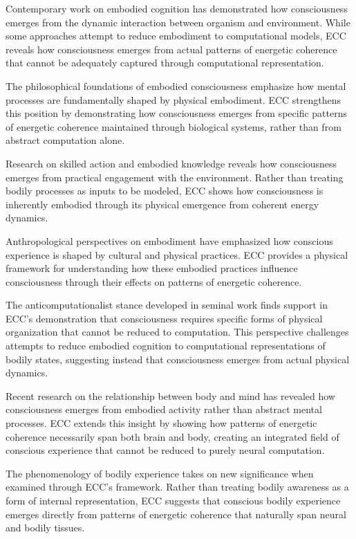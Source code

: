 \begin{refsection}
Contemporary work on embodied cognition \cite{Clark1997} has demonstrated how consciousness emerges from the dynamic interaction between organism and environment. While some approaches attempt to reduce embodiment to computational models, ECC reveals how consciousness emerges from actual patterns of energetic coherence that cannot be adequately captured through computational representation.

The philosophical foundations of embodied consciousness \cite{Lakoff1999} emphasize how mental processes are fundamentally shaped by physical embodiment. ECC strengthens this position by demonstrating how consciousness emerges from specific patterns of energetic coherence maintained through biological systems, rather than from abstract computation alone.

Research on skilled action and embodied knowledge \cite{Ingold2000} reveals how consciousness emerges from practical engagement with the environment. Rather than treating bodily processes as inputs to be modeled, ECC shows how consciousness is inherently embodied through its physical emergence from coherent energy dynamics.

Anthropological perspectives on embodiment \cite{Csordas1994} have emphasized how conscious experience is shaped by cultural and physical practices. ECC provides a physical framework for understanding how these embodied practices influence consciousness through their effects on patterns of energetic coherence.

The anticomputationalist stance developed in seminal work \cite{Dreyfus1992} finds support in ECC's demonstration that consciousness requires specific forms of physical organization that cannot be reduced to computation. This perspective challenges attempts to reduce embodied cognition to computational representations of bodily states, suggesting instead that consciousness emerges from actual physical dynamics.

Recent research on the relationship between body and mind \cite{Gallagher2005} has revealed how consciousness emerges from embodied activity rather than abstract mental processes. ECC extends this insight by showing how patterns of energetic coherence necessarily span both brain and body, creating an integrated field of conscious experience that cannot be reduced to purely neural computation.

The phenomenology of bodily experience \cite{Leder1990} takes on new significance when examined through ECC's framework. Rather than treating bodily awareness as a form of internal representation, ECC suggests that conscious bodily experience emerges directly from patterns of energetic coherence that naturally span neural and bodily tissues.


\end{refsection}
